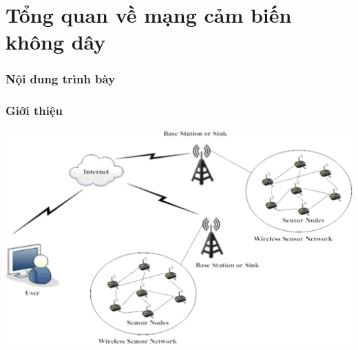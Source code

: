 \section{Tổng quan về mạng cảm biến không dây}
\begin{frame}[noframenumbering]
    \frametitle{Nội dung trình bày}
    \tableofcontents[currentsection]
\end{frame}

\begin{frame}
    \frametitle{Giới thiệu}
    \includegraphics[width=\linewidth]{picture/wsn.jpg}
    
\end{frame}

